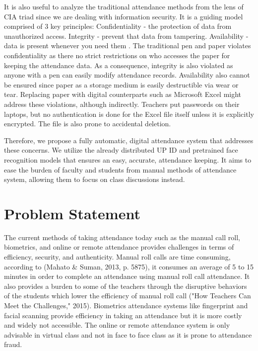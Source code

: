 It is also useful to analyze the traditional attendance methods from the lens of CIA triad since we are dealing with information security. It is a guiding model comprised of 3 key principles: Confidentiality - the protection of data from unauthorized access. Integrity - prevent that data from tampering. Availability - data is present whenever you need them \cite{cawthra2020data}. The traditional pen and paper violates confidentiality as there no strict restrictions on who accesses the paper for keeping the attendance data. As a consequence, integrity is also violated as anyone with a pen can easily modify attendance records. Availability also cannot be ensured since paper as a storage medium is easily destructible via wear or tear. Replacing paper with digital counterparts such as Microsoft Excel might address these violations, although indirectly. Teachers put passwords on their laptops, but no authentication is done for the Excel file itself unless it is explicitly encrypted. The file is also prone to accidental deletion.

Therefore, we propose a fully automatic, digital attendance system that addresses these concerns. We utilize the already distributed UP ID and pretrained face recognition models that ensures an easy, accurate, attendance keeping. It aims to ease the burden of faculty and students from manual methods of attendance system, allowing them to focus on class discussions instead.

\section{Problem Statement}
The current methods of taking attendance today such as the manual call roll, biometrics, and online or remote attendance provides challenges in terms of efficiency, security, and authenticity. Manual roll calls are time consuming, according to (Mahato \& Suman, 2013, p. 5875), it consumes an average of 5 to 15 minutes in order to complete an attendance using manual roll call attendance. It also provides a burden to some of the teachers through the disruptive behaviors of the students which lower the efficiency of manual roll call ("How Teachers Can Meet the Challenges," 2015). Biometrics attendance systems like fingerprint and facial scanning provide efficiency in taking an attendance but it is more costly and widely not accessible. The online or remote attendance system is only advisable in virtual class and not in face to face class as it is prone to attendance fraud.

